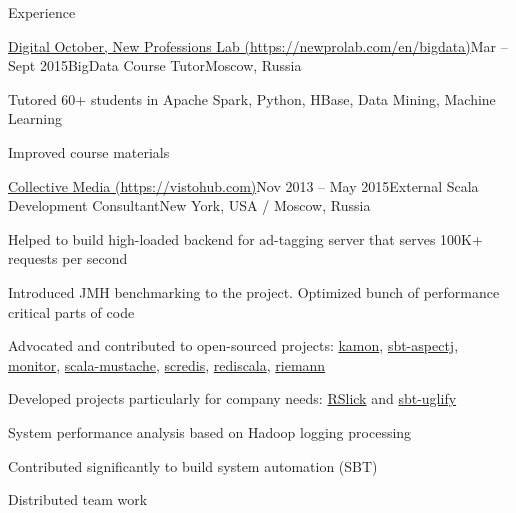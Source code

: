\documentclass{resume} %
\begin{document}
\begin{rSection}{Experience}

\begin{samepage}
\begin{rSubsection}{\href{https://newprolab.com/en/bigdata/}{Digital October, New Professions Lab
(https://newprolab.com/en/bigdata)}}{Mar -- Sept 2015}{BigData Course Tutor}{Moscow,
Russia}
\item Tutored 60+ students in Apache Spark, Python, HBase, Data Mining, Machine Learning
\item Improved course materials
\end{rSubsection}
\end{samepage}


\begin{rSubsection}{\href{https://www.vistohub.com/}{Collective Media
(https://vistohub.com)}}{Nov 2013 -- May 2015}{External Scala Development Consultant}{New
York, USA / Moscow, Russia}
\item Helped to build high-loaded backend for ad-tagging server that serves 100K+ requests per
second
\item Introduced JMH benchmarking to the project. Optimized bunch of performance critical parts of
code
\item Advocated and contributed to open-sourced projects:
\href{https://github.com/kamon-io/Kamon}{kamon},
\href{https://github.com/sbt/sbt-aspectj}{sbt-aspectj},
\href{https://github.com/eigengo/monitor}{monitor},
\href{https://github.com/vspy/scala-mustache}{scala-mustache},
\href{https://github.com/Livestream/scredis}{scredis},
\href{https://github.com/etaty/rediscala}{rediscala},
\href{https://github.com/aphyr/riemann}{riemann}
\item Developed projects particularly for company needs:
\href{http://github.com/alexander-myltsev/RSlick}{RSlick} and
\href{http://github.com/alexander-myltsev/sbt-uglify}{sbt-uglify}
\item System performance analysis based on Hadoop logging processing
\item Contributed significantly to build system automation (SBT)
\item Distributed team work
\end{rSubsection}



\end{rSection}
\end{document}

